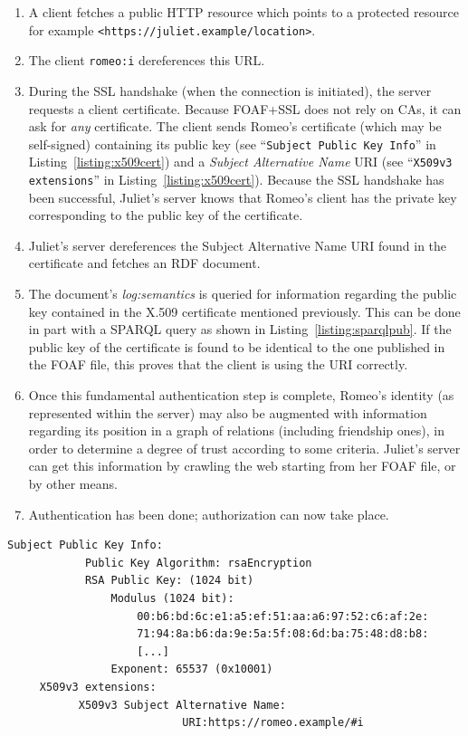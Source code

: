 \documentclass{llncs}
\begin{document}
\begin{enumerate}
\item A client fetches a public HTTP resource which points to a
  protected resource for example {\tt <https://juliet.example/location>}.
\item The client {\tt romeo:i} dereferences this URL.
\item During the SSL handshake (when the connection is initiated), the
  server requests a client certificate. Because FOAF+SSL does not rely
  on CAs, it can ask for {\em any} certificate.  The client sends
  Romeo's certificate (which may be self-signed) containing its public
  key (see ``{\tt Subject Public Key Info}'' in
  Listing~\ref{listing:x509cert}) and a {\em Subject Alternative Name}
  URI (see ``{\tt X509v3 extensions}'' in
  Listing~\ref{listing:x509cert}).  Because the SSL handshake has been
  successful, Juliet's server knows that Romeo's client has the
  private key corresponding to the public key of the certificate.
\item Juliet's server dereferences the Subject Alternative Name URI
  found in the certificate and fetches an RDF document.
\item The document's {\em log:semantics} is queried for information
  regarding the public key contained in the X.509 certificate
  mentioned previously.  This can be done in part with a SPARQL query
  as shown in Listing~\ref{listing:sparqlpub}.  If the public key of
  the certificate is found to be identical to the one published in the
  FOAF file, this proves that the client is using the URI correctly.
\item Once this fundamental authentication step is complete, Romeo's
  identity (as represented within the server) may also be augmented
  with information regarding its position in a graph of relations
  (including friendship ones), in order to determine a degree of trust
  according to some criteria. Juliet's server can get this information
  by crawling the web starting from her FOAF file, or by other means.
\item Authentication has been done; authorization can now take place.
\end{enumerate}

\begin{lstlisting}[basicstyle=\rm\scriptsize\ttfamily,label={listing:x509cert},caption={Excerpt of a text representation of a FOAF+SSL certificate.}]
     Subject Public Key Info:
            Public Key Algorithm: rsaEncryption
            RSA Public Key: (1024 bit)
                Modulus (1024 bit):
                    00:b6:bd:6c:e1:a5:ef:51:aa:a6:97:52:c6:af:2e:
                    71:94:8a:b6:da:9e:5a:5f:08:6d:ba:75:48:d8:b8:
                    [...]     
                Exponent: 65537 (0x10001)
     X509v3 extensions:
           X509v3 Subject Alternative Name: 
                           URI:https://romeo.example/#i
\end{lstlisting}
\end{document}
